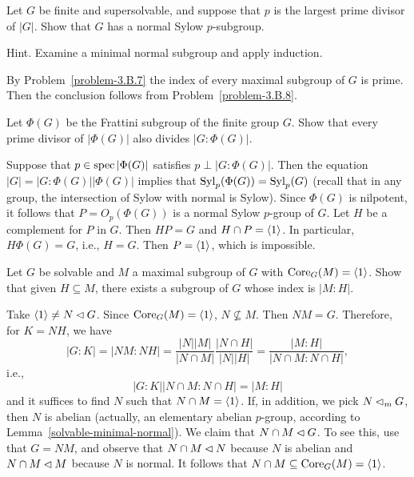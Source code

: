 \begin{probl}
    Let\/ $G$ be finite and supersolvable, and suppose that\/ $p$ is the largest prime divisor of\/ $|G|$. Show that\/ $G$ has a normal Sylow\/ $p$-subgroup.

    \textrm{\rm Hint. Examine a minimal normal subgroup and apply induction.}
\end{probl}

\begin{solution} By Problem~\ref{problem-3.B.7} the index of every maximal subgroup of $G$ is prime. Then the conclusion follows from Problem~\ref{problem-3.B.8}.  \end{solution}

\begin{probl}
    Let\/ $\Phi(G)$ be the Frattini subgroup of the finite group\/ $G$. Show that every prime divisor of\/ $|\Phi(G)|$ also divides\/ $|G:\Phi(G)|$.
\end{probl}

\begin{solution} Suppose that $p\in\operatorname{spec}|\Phi(G)|$ satisfies $p\perp|G:\Phi(G)|$. Then the equation $|G|=|G:\Phi(G)||\Phi(G)|$ implies that ${\rm Syl}_p(\Phi(G))={\rm Syl}_p(G)$ (recall that in any group, the intersection of Sylow with normal is Sylow). Since $\Phi(G)$ is nilpotent, it follows that $P=O_p(\Phi(G))$ is a normal Sylow $p$-group of $G$. Let $H$ be a complement for $P$ in $G$. Then $HP=G$ and $H\cap P=\langle1\rangle$. In particular, $H\Phi(G)=G$, i.e., $H=G$. Then $P=\langle1\rangle$, which is impossible.  \end{solution}

\begin{probl}\label{problem-3.B.12}
    Let\/ $G$ be solvable and $M$ a maximal subgroup of\/ $G$ with ${\rm Core}_G(M)=\langle1\rangle$. Show that given\/ $H \subseteq M$, there exists a subgroup of\/ $G$ whose index is\/ $|M : H|$.
\end{probl}

\begin{solution} Take $\langle1\rangle\ne N\lhd G$. Since ${\rm Core}_G(M)=\langle1\rangle$, $N\not\subseteq M$. Then $NM=G$. Therefore, for $K=NH$, we have
$$
    |G:K|=|NM:NH|=\frac{|N||M|}{|N\cap M|}\frac{|N\cap H|}{|N||H|}
        =\frac{|M:H|}{|N\cap M:N\cap H|},
$$
i.e.,
$$
    |G:K||N\cap M:N\cap H|=|M:H|
$$
and it suffices to find $N$ such that $N\cap M=\langle1\rangle$. If, in addition, we pick $N\lhd_mG$, then $N$ is abelian (actually, an elementary abelian $p$-group, according to Lemma~\ref{solvable-minimal-normal}). We claim that $N\cap M\lhd G$. To see this, use that $G=NM$, and observe that $N\cap M\lhd N$ because $N$ is abelian and $N\cap M\lhd M$ because $N$ is normal. It follows that $N\cap M\subseteq{\rm Core}_G(M)=\langle1\rangle$.  \end{solution}


